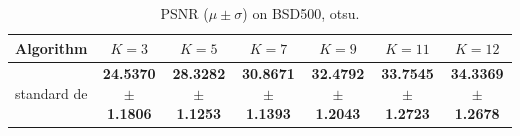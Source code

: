 \begin{table}[htbp]
\centering
\caption{PSNR ($\mu \pm \sigma$) on BSD500, otsu.}
\label{tab:exp1-otsu-psnr}
\begin{tabular}{lcccccc}
\toprule
Algorithm & $K=3$ & $K=5$ & $K=7$ & $K=9$ & $K=11$ & $K=12$ \\
\midrule
standard de & \textbf{24.5370 $\pm$ 1.1806} & \textbf{28.3282 $\pm$ 1.1253} & \textbf{30.8671 $\pm$ 1.1393} & \textbf{32.4792 $\pm$ 1.2043} & \textbf{33.7545 $\pm$ 1.2723} & \textbf{34.3369 $\pm$ 1.2678} \\
\bottomrule
\end{tabular}
\end{table}